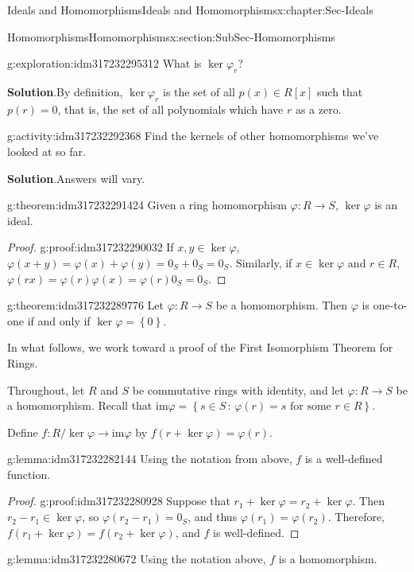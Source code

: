 \documentclass[oneside,10pt,]{book}
\newcommand{\blocktitlefont}{\relax}
\numberwithin{equation}{section}
\def\p{\varphi}
\def\im{\text{im}}
\newcommand{\set}[1]{\left\{ {#1} \right\}}
\newcommand{\setof}[2]{{\left\{#1\,\colon\,#2\right\}}}
\begin{document}
\begin{chapterptx}{Ideals and Homomorphisms}{}{Ideals and Homomorphisms}{}{}{x:chapter:Sec-Ideals}
\begin{sectionptx}{Homomorphisms}{}{Homomorphisms}{}{}{x:section:SubSec-Homomorphisms}
\begin{exploration}{}{g:exploration:idm317232295312}
What is \(\ker \p_r\)?%
\par\smallskip%
\noindent\textbf{\blocktitlefont Solution}.\hypertarget{g:solution:idm317232294240}{}\quad{}By definition, \(\ker \p_r\) is the set of all \(p(x)\in R[x]\) such that \(p(r) =0\), that is, the set of all polynomials which have \(r\) as a zero.\end{exploration}
\begin{activity}{}{g:activity:idm317232292368}%
Find the kernels of other homomorphisms we've looked at so far.%
\par\smallskip%
\noindent\textbf{\blocktitlefont Solution}.\hypertarget{g:solution:idm317232291776}{}\quad{}Answers will vary.\end{activity}
\begin{theorem}{}{}{g:theorem:idm317232291424}%
Given a ring homomorphism \(\p : R\to S\), \(\ker\p\) is an ideal.%
\end{theorem}
\begin{proof}{}{g:proof:idm317232290032}
If \(x,y\in \ker\p\), \(\p(x+y) = \p(x) + \p(y) = 0_S + 0_S = 0_S\). Similarly, if \(x\in \ker \p\) and \(r\in R\), \(\p(rx) = \p(r) \p(x) = \p(r) 0_S = 0_S\).%
\end{proof}
\begin{theorem}{}{}{g:theorem:idm317232289776}%
Let \(\p : R\to S\) be a homomorphism. Then \(\p\) is one-to-one if and only if \(\ker\p = \set{0}\).%
\end{theorem}
In what follows, we work toward a proof of the First Isomorphism Theorem for Rings.%
\par
Throughout, let \(R\) and \(S\) be commutative rings with identity, and let \(\p : R\to S\) be a homomorphism. Recall that \(\im \p = \setof{s\in S}{\p(r) = s\text{ for some } r\in R}\).%
\par
Define \(f: R/\ker \p \to \im \p\) by \(f(r+\ker \p) = \p(r)\).%
\begin{lemma}{}{}{g:lemma:idm317232282144}%
Using the notation from above, \(f\) is a well-defined function.%
\end{lemma}
\begin{proof}{}{g:proof:idm317232280928}
Suppose that \(r_1 + \ker\p = r_2 + \ker\p\). Then \(r_2-r_1 \in \ker\p\), so \(\p(r_2-r_1) = 0_S\), and thus \(\p(r_1) = \p(r_2)\). Therefore, \(f(r_1+\ker\p) = f(r_2+\ker\p)\), and \(f\) is well-defined.%
\end{proof}
\begin{lemma}{}{}{g:lemma:idm317232280672}%
Using the notation above, \(f\) is a homomorphism.%

\end{lemma}
\end{sectionptx}
\end{chapterptx}
\end{document}
